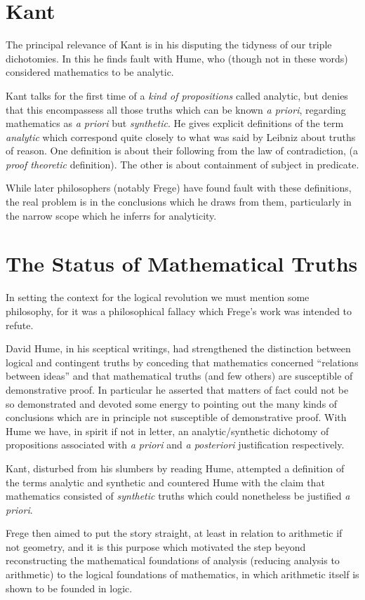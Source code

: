 
\section{Kant}

The principal relevance of Kant is in his disputing the tidyness of our triple dichotomies.
In this he finds fault with Hume, who (though not in these words) considered mathematics to be analytic.

Kant talks for the first time of a {\it kind of propositions} called analytic, but denies that this encompassess all those truths which can be known {\it a priori}, regarding mathematics as {\it a priori} but {\it synthetic}.
He gives explicit definitions of the term {\it analytic} which correspond quite closely to what was said by Leibniz about truths of reason.
One definition is about their following from the law of contradiction, (a {\it proof theoretic} definition).
The other is about containment of subject in predicate.

While later philosophers (notably Frege) have found fault with these definitions, the real problem is in the conclusions which he draws from them, particularly in the narrow scope which he inferrs for analyticity.


\section{The Status of Mathematical Truths}

In setting the context for the logical revolution we must mention some philosophy, for it was a philosophical fallacy which Frege's work was intended to refute.

David Hume, in his sceptical writings, had strengthened the distinction between logical and contingent truths by conceding that mathematics concerned ``relations between ideas'' and that mathematical truths (and few others) are susceptible of demonstrative proof.
In particular he asserted that matters of fact could not be so demonstrated and devoted some energy to pointing out the many kinds of conclusions which are in principle not susceptible of demonstrative proof.
With Hume we have, in spirit if not in letter, an analytic/synthetic dichotomy of propositions associated with {\it a priori} and {\it a posteriori} justification respectively.

Kant, disturbed from his slumbers by reading Hume, attempted a definition of the terms analytic and synthetic and countered Hume with the claim that mathematics consisted of {\it synthetic} truths which could nonetheless be justified {\it a priori}. 

Frege then aimed to put the story straight, at least in relation to arithmetic if not geometry, and it is this purpose which motivated the step beyond reconstructing the mathematical foundations of analysis (reducing analysis to arithmetic) to the logical foundations of mathematics, in which arithmetic itself is shown to be founded in logic.









